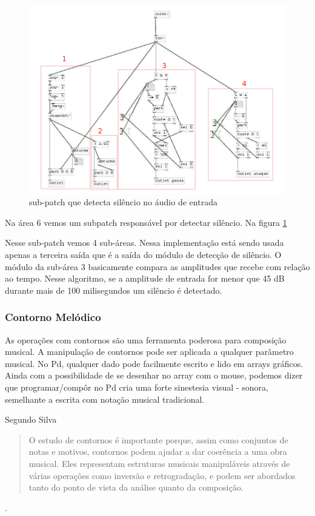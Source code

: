 \documentclass{ppgmus}
\begin{document}
\begin{figure}
\includegraphics[scale=.5]{sinc-audioanalise-detecta}
\caption{sub-patch que detecta silêncio no áudio de entrada}
\label{[sinc-audioanalise-detecta]}
\end{figure}




Na área 6 vemos um subpatch responsável por detectar
silêncio. Na figura \ref{[sinc-audioanalise-detecta]}


Nesse sub-patch vemos 4 sub-áreas. Nessa implementação
está sendo usada apenas a terceira saída que é a saída do
módulo de detecção de silêncio. O módulo da sub-área 3
basicamente compara as amplitudes que recebe com relação ao tempo.
Nesse algoritmo, se a amplitude de entrada for menor que 45 dB durante
mais de 100 milisegundos um silêncio é detectado.

\subsubsection{Contorno Melódico}
\label{contornos}


As operações com contornos são uma ferramenta poderosa para
composição musical\cite{sampaio08:torno}. A manipulação de contornos
pode ser aplicada a qualquer parâmetro musical.
No Pd, qualquer dado pode facilmente escrito e lido em arrays gráficos.
Ainda com a possibilidade de se desenhar no array com o mouse, podemos
dizer que programar/compôr no Pd cria uma
forte sinestesia visual - sonora, semelhante a escrita
com notação musical tradicional.

Segundo Silva \begin{quote}
               O estudo de contornos é importante porque, assim como conjuntos de notas e motivos,
               contornos podem ajudar a dar coerência a uma obra musical. Eles representam estruturas
		musicais manipuláveis através de várias operações como inversão e retrogradação, e podem
		ser abordados tanto do ponto de vista da análise quanto da composição.
              \end{quote} \cite{sampaio08:torno}.
\end{document}
